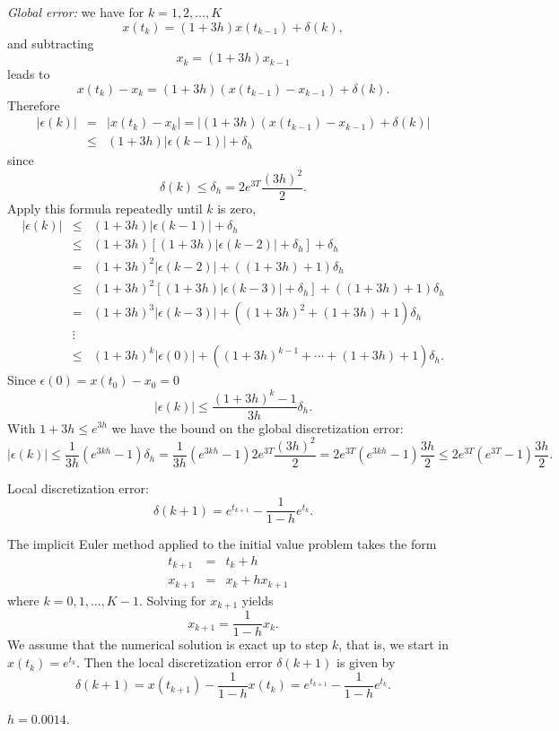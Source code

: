 \documentclass{ximera}
\begin{document}
{\em Global error:} we have for $k=1,2,\ldots,K$
\[
x(t_k)=(1+3h)x(t_{k-1})+\delta(k),
\]
and subtracting
\[
x_k = (1+3h)x_{k-1}
\]
leads to
\[
x(t_k) - x_k = (1+3h)(x(t_{k-1})-x_{k-1})+\delta(k).
\]
Therefore
\begin{eqnarray*}
|\epsilon(k)| & = & |x(t_k) - x_k| =
|(1+3h)(x(t_{k-1})-x_{k-1})+\delta(k)|\\
& \le & (1+3h)|\epsilon(k-1)|+\delta_h
\end{eqnarray*}
since
\[
\delta(k)\le \delta_h = 2e^{3T}\frac{(3h)^2}{2}.
\]
Apply this formula repeatedly until $k$ is zero,
\[
\begin{array}{rcl}
|\epsilon(k)|&\le&(1+3h)|\epsilon(k-1)|+\delta_h\\
&\le& (1+3h)[(1+3h)|\epsilon(k-2)|+\delta_h]+\delta_h\\
&=& (1+3h)^2|\epsilon(k-2)| + ((1+3h) + 1)\delta_h\\
&\le& (1+3h)^2[(1+3h)|\epsilon(k-3)|+\delta_h] + ((1+3h) + 1)\delta_h\\
&=& (1+3h)^3|\epsilon(k-3)| + ((1+3h)^2 + (1+3h) + 1)\delta_h\\
&\vdots& \\
&\le & (1+3h)^k|\epsilon(0)| + ((1+3h)^{k-1} +\cdots + (1+3h) + 1)\delta_h.
\end{array}
\]
Since $\epsilon(0)=x(t_0) - x_0=0$
\[
|\epsilon(k)| \le \frac{(1+3h)^k -1}{3h}\delta_h.
\]
With $1+3h\le e^{3h}$ we have the bound on the global discretization error:
\[
|\epsilon(k)| \le \frac{1}{3h} (e^{3kh}-1)\delta_h=
\frac{1}{3h}(e^{3kh}-1)2e^{3T}\frac{(3h)^2}{2} =
2e^{3T}(e^{3kh}-1)\frac{3h}{2}
\le 2e^{3T}(e^{3T}-1)\frac{3h}{2}.
\]

 \ans Local discretization error:
\[
\delta(k+1) = e^{t_{k+1}} - \frac{1}{1-h} e^{t_k}.
\]

\soln The implicit Euler method applied to the initial value problem
 takes the form
\[
\begin{array}{rclc}
t_{k+1} & = & t_k+h & \\
x_{k+1} & = & x_k + h x_{k+1} &
\end{array}
\]
where $k=0,1,\ldots,K-1$.  Solving for $x_{k+1}$ yields
\[
x_{k+1} = \frac{1}{1-h}x_k.
\]
We assume that the numerical solution is exact up to step $k$, that is,
we start in $x(t_k)=e^{t_k}$.  Then the local discretization error
$\delta(k+1)$ is given by
\[
\delta(k+1) = x(t_{k+1}) - \frac{1}{1-h}x(t_k)=
e^{t_{k+1}} - \frac{1}{1-h}e^{t_k}.
\]

 \ans $h=0.0014$.
\end{document}

